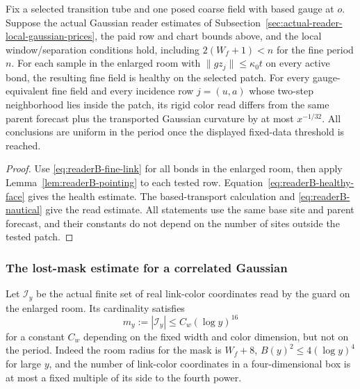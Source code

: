 \begin{proposition}
\label{prop:readerB-curvature-read}
Fix a selected transition tube and one posed coarse field with based gauge
at $o$. Suppose the actual Gaussian reader estimates of
Subsection~\ref{sec:actual-reader-local-gaussian-prices}, the paid row and chart
bounds above, and the local window/separation conditions hold, including
$2(W_f+1)<n$ for the fine period $n$. For each sample in the
enlarged room with $\|gz_j\|\le\kappa_0t$ on every active bond,
the resulting fine field is healthy on the selected patch. For every gauge-equivalent fine field and every incidence row $j=(u,a)$
whose two-step neighborhood lies inside the patch, its rigid color read differs from the same parent
forecast plus the transported Gaussian curvature by at most
$x^{-1/32}$. All conclusions are uniform in the period once the displayed
fixed-data threshold is reached.
\end{proposition}
\begin{proof}
Use \eqref{eq:readerB-fine-link} for all bonds in the enlarged room,
then apply Lemma~\ref{lem:readerB-pointing} to each tested row.
Equation~\eqref{eq:readerB-healthy-face} gives the health estimate.
The based-transport calculation and \eqref{eq:readerB-nautical} give
the read estimate. All statements use
the same base site and parent forecast, and their constants do not depend
on the number of sites outside the tested patch.
\end{proof}

\subsubsection{The lost-mask estimate for a correlated Gaussian}

Let $\mathcal I_y$ be the actual finite set of real link-color coordinates
read by the guard on the enlarged room. Its cardinality satisfies
\begin{equation}\label{eq:readerB-room-dimension}
 m_y:=|\mathcal I_y|\leq C_w(\log y)^{16}
\end{equation}
for a constant $C_w$ depending on the fixed width and color dimension, but
not on the period. Indeed the room radius for the mask is $W_f+8$,
$B(y)^2\le4(\log y)^4$ for large $y$, and the number of
link-color coordinates in a four-dimensional box is at most a fixed
multiple of its side to the fourth power.

